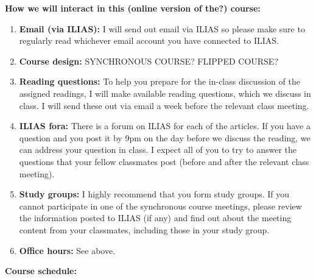 \documentclass[12pt,fleqn,a4]{extarticle}
\newcommand{\6}{\mbox{$[\hspace*{-.6mm}[$}}
\newcommand{\9}{\mbox{$]\hspace*{-.6mm}]$}}
\begin{document}
\bigskip

{\bf How we will interact in this (online version of the?) course:}

\begin{enumerate}[topsep=-3pt,itemsep=-1pt,leftmargin=15pt]

\item {\bf Email (via ILIAS):} I will send out email via ILIAS so please make sure to regularly read whichever email account you have connected to ILIAS.

\item {\bf Course design:} SYNCHRONOUS COURSE? FLIPPED COURSE? 

\item {\bf Reading questions:} To help you prepare for the in-class discussion of the assigned readings, I will make available reading questions, which we discuss in class. I will send these out via email a week before the relevant class meeting.

\item {\bf ILIAS fora:} There is a forum on ILIAS for each of the articles. If you have a question and you post it by 9pm on the day before we discuss the reading, we can address your question in class. I expect all of you to try to answer the questions that your fellow classmates post (before and after the relevant class meeting).

\item {\bf Study groups:} I highly recommend that you form study groups. If you cannot participate in one of the synchronous course meetings, please review the information posted to ILIAS (if any) and find out about the meeting content from your classmates, including those in your study group. 

\item {\bf Office hours:} See above.

\end{enumerate}

\newpage

{\bf Course schedule:}
\end{document}
